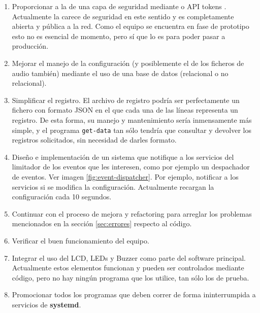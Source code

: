 \begin{enumerate}
	\item Proporcionar a la  de una capa de seguridad mediante  \cite{oauth} o API tokens \cite{openapi-auth}.
	\subitem \noindent Actualmente la  carece de seguridad en este sentido y es completamente abierta y pública a la red. Como el equipo se encuentra en fase de prototipo esto no es esencial de momento, pero sí que lo es para poder pasar a producción.

	\item Mejorar el manejo de la configuración (y posiblemente el de los ficheros de audio también) mediante el uso de una base de datos (relacional o no relacional).

	\item Simplificar el registro.
	\subitem El archivo de registro podría ser perfectamente un fichero con formato \acrshort{JSON} en el que cada una de las líneas representa un registro. De esta forma, su manejo y mantenimiento sería inmensamente más simple, y el programa \texttt{get-data} tan sólo tendría que consultar y devolver los registros solicitados, sin necesidad de darles formato.

	\item Diseño e implementación de un sistema que notifique a los servicios del limitador de los eventos que les interesen, como por ejemplo un despachador de eventos. Ver imagen \ref{fig:event-dispatcher}.
	\subitem \noindent Por ejemplo, notificar a los servicios si se modifica la configuración. Actualmente recargan la configuración cada 10 segundos.

	\item Continuar con el proceso de mejora y refactoring para arreglar los problemas mencionados en la sección \ref{sec:errores} respecto al código.

	\item Verificar el buen funcionamiento del equipo.

	\item Integrar el uso del \acrshort{LCD}, \acrshort{LED}s y Buzzer como parte del software principal.
	\subitem \noindent Actualmente estos elementos funcionan y pueden ser controlados mediante código, pero no hay ningún programa que los utilice, tan sólo los de prueba.

	\item Promocionar todos los programas que deben correr de forma ininterrumpida a servicios de \textbf{systemd}.
\end{enumerate}


